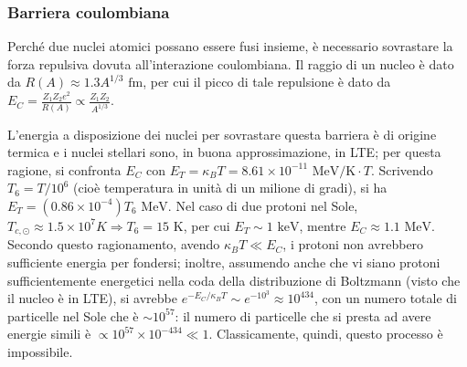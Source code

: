 \documentclass[11pt, a4paper]{scrartcl}
\theoremstyle{style}
\theoremstyle{style1}
\numberwithin{equation}{subsection}
\begin{document}
\subsubsection{Barriera coulombiana}

Perch\'e due nuclei atomici possano essere fusi insieme, \`e necessario sovrastare la forza repulsiva dovuta all'interazione coulombiana.
Il raggio di un nucleo \`e dato da $R(A) \approx 1.3 A^{1 / 3} \text{ fm}$, per cui il picco di tale repulsione \`e dato da $E_C = \frac{Z_1Z_2 e^2}{R(A)} \propto \frac{Z_1 Z_2}{A^{1/3}}$.

L'energia a disposizione dei nuclei per sovrastare questa barriera \`e di origine termica e i nuclei stellari sono, in buona approssimazione, in LTE; per questa ragione, si confronta $E_C$ con $E_T = \kappa _B T = 8.61 \times 10^{-11}\text{ MeV/K} \cdot T$. 
Scrivendo $T_6 = T / 10^6$ (cio\`e temperatura in unit\`a di un milione di gradi), si ha $E_T = (0.86 \times 10^{-4}) T_6 \text{ MeV}$.
Nel caso di due protoni nel Sole, $T_{c, \odot } \approx 1.5 \times 10^{7} K\Rightarrow T_6 = 15\text{ K}$, per cui $E_T\sim 1 \text{ keV}$, mentre $E_C \approx 1.1\text{ MeV}$.
Secondo questo ragionamento, avendo $\kappa _B T \ll E_C$, i protoni non avrebbero sufficiente energia per fondersi; inoltre, assumendo anche che vi siano protoni sufficientemente energetici nella coda della distribuzione di Boltzmann (visto che il nucleo \`e in LTE), si avrebbe $e^{- E_C / \kappa _B T} \sim e^{-10^3} \approx 10^{434}$, con un numero totale di particelle nel Sole che \`e $\sim 10^{57}$: il numero di particelle che si presta ad avere energie simili \`e $\propto 10^{57} \times 10^{-434} \ll 1$.
Classicamente, quindi, questo processo \`e impossibile.
\end{document}
